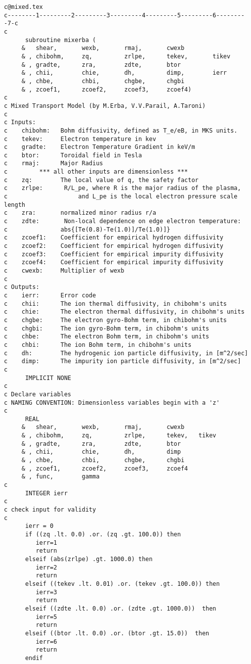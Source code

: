 \begin{verbatim}
c@mixed.tex
c--------1---------2---------3---------4---------5---------6---------7-c
c
      subroutine mixerba (
     &   shear,       wexb,       rmaj,       cwexb
     & , chibohm,     zq,         zrlpe,      tekev,       tikev      
     & , gradte,      zra,        zdte,       btor      
     & , chii,        chie,       dh,         dimp,        ierr
     & , chbe,        chbi,       chgbe,      chgbi
     & , zcoef1,      zcoef2,     zcoef3,     zcoef4)
c
c Mixed Transport Model (by M.Erba, V.V.Parail, A.Taroni)
c
c Inputs:
c    chibohm:   Bohm diffusivity, defined as T_e/eB, in MKS units.
c    tekev:     Electron temperature in kev
c    gradte:    Electron Temperature Gradient in keV/m
c    btor:      Toroidal field in Tesla
c    rmaj:      Major Radius
c         *** all other inputs are dimensionless ***
c    zq:        The local value of q, the safety factor
c    zrlpe:      R/L_pe, where R is the major radius of the plasma,
c                    and L_pe is the local electron pressure scale length
c    zra:       normalized minor radius r/a
c    zdte:       Non-local dependence on edge electron temperature:
c               abs{[Te(0.8)-Te(1.0)]/Te(1.0)]}
c    zcoef1:    Coefficient for empirical hydrogen diffusivity
c    zcoef2:    Coefficient for empirical hydrogen diffusivity
c    zcoef3:    Coefficient for empirical impurity diffusivity
c    zcoef4:    Coefficient for empirical impurity diffusivity
c    cwexb:     Multiplier of wexb
c
c Outputs:
c    ierr:      Error code
c    chii:      The ion thermal diffusivity, in chibohm's units
c    chie:      The electron thermal diffusivity, in chibohm's units
c    chgbe:     The electron gyro-Bohm term, in chibohm's units
c    chgbi:     The ion gyro-Bohm term, in chibohm's units
c    chbe:      The electron Bohm term, in chibohm's units
c    chbi:      The ion Bohm term, in chibohm's units
c    dh:        The hydrogenic ion particle diffusivity, in [m^2/sec]
c    dimp:      The impurity ion particle diffusivity, in [m^2/sec]
c
      IMPLICIT NONE
c
c Declare variables
c NAMING CONVENTION: Dimensionless variables begin with a 'z'
c
      REAL
     &   shear,       wexb,       rmaj,       cwexb     
     & , chibohm,     zq,         zrlpe,      tekev,   tikev      
     & , gradte,      zra,        zdte,       btor      
     & , chii,        chie,       dh,         dimp
     & , chbe,        chbi,       chgbe,      chgbi
     & , zcoef1,      zcoef2,     zcoef3,     zcoef4
     & , func,        gamma
c
      INTEGER ierr
c
c check input for validity
c
      ierr = 0
      if ((zq .lt. 0.0) .or. (zq .gt. 100.0)) then 
         ierr=1
         return
      elseif (abs(zrlpe) .gt. 1000.0) then
         ierr=2
         return
      elseif ((tekev .lt. 0.01) .or. (tekev .gt. 100.0)) then
         ierr=3
         return
      elseif ((zdte .lt. 0.0) .or. (zdte .gt. 1000.0))  then
         ierr=5
         return
      elseif ((btor .lt. 0.0) .or. (btor .gt. 15.0))  then
         ierr=6
         return
      endif
\end{verbatim}

